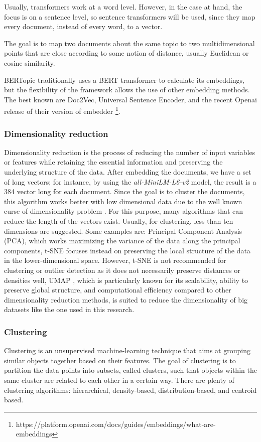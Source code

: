 Usually, transformers work at a word level. However, in the case at hand, the focus is on a sentence level, so  sentence transformers will be used, since they map every document, instead of every word, to a vector.

The goal is to map two documents about the same topic to two multidimensional points that are close according to some notion of distance, usually Euclidean or cosine similarity.

BERTopic traditionally uses a BERT transformer to calculate its embeddings, but the flexibility of the framework allows the use of other embedding methods. The best known are Doc2Vec, Universal Sentence Encoder, and the recent Openai release of their version of embedder \footnote{https://platform.openai.com/docs/guides/embeddings/what-are-embeddings}.

\subsubsection{Dimensionality reduction}
Dimensionality reduction is the process of reducing the number of input variables or features while retaining the essential information and preserving the underlying structure of the data.
After embedding the documents, we have a set of long vectors; for instance, by using the \textit{all-MiniLM-L6-v2} model, the result is a 384 vector long for each document.
Since the goal is to cluster the documents, this algorithm works better with low dimensional data due to the well known curse of dimensionality problem \cite{steinbach_dimensionality_2004}. 
For this purpose,  many algorithms  that can reduce the length of the vectors exist. Usually, for clustering,  less than ten dimensions are suggested.
Some examples are:
Principal Component Analysis \cite{mackiewicz_principal_1993}(PCA), which works maximizing the variance of the data along the principal components, 
t-SNE \cite{JMLR:v9:vandermaaten08a}focuses instead on preserving the local structure of the data in the lower-dimensional space. However, t-SNE is not recommended for clustering or outlier detection as it does not necessarily preserve distances or densities well, 
UMAP \cite{McInnes2018}, which is particularly known for its scalability, ability to preserve global structure, and computational efficiency compared to other dimensionality reduction methods, is suited to reduce the dimensionality of big datasets like the one used in this research.

\subsubsection{Clustering}
Clustering is an unsupervised machine-learning technique that aims at grouping similar objects together based on their features. The goal of clustering is to partition the data points into subsets, called clusters, such that objects within the same cluster are related to each other in a certain way. There are plenty of clustering algorithms: hierarchical, density-based, distribution-based, and centroid based.

